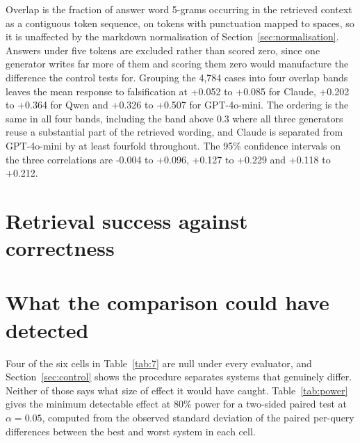 \documentclass[11pt]{article}
\begin{document}
Overlap is the fraction of answer word 5-grams occurring in the retrieved context as a contiguous token sequence, on tokens with punctuation mapped to spaces, so it is unaffected by the markdown normalisation of Section~\ref{sec:normalisation}. Answers under five tokens are excluded rather than scored zero, since one generator writes far more of them and scoring them zero would manufacture the difference the control tests for. Grouping the 4,784 cases into four overlap bands leaves the mean response to falsification at +0.052 to +0.085 for Claude, +0.202 to +0.364 for Qwen and +0.326 to +0.507 for GPT-4o-mini. The ordering is the same in all four bands, including the band above 0.3 where all three generators reuse a substantial part of the retrieved wording, and Claude is separated from GPT-4o-mini by at least fourfold throughout. The 95\% confidence intervals on the three correlations are -0.004 to +0.096, +0.127 to +0.229 and +0.118 to +0.212.

\section{Retrieval success against correctness}
\label{app:cell}

\begin{table}[t]
\centering
{}
\caption{Correctness from graded judgement. The raw cell is 17 to 36 per cent of queries; the share that is a grounded, committed, wrong answer is 4.5 to 7.9 per cent.}
\label{tab:6}
\end{table}


\section{What the comparison could have detected}
\label{app:power}

Four of the six cells in Table~\ref{tab:7} are null under every evaluator, and Section~\ref{sec:control} shows the procedure separates systems that genuinely differ. Neither of those says what size of effect it would have caught. Table~\ref{tab:power} gives the minimum detectable effect at 80\% power for a two-sided paired test at $\alpha = 0.05$, computed from the observed standard deviation of the paired per-query differences between the best and worst system in each cell.
\end{document}
